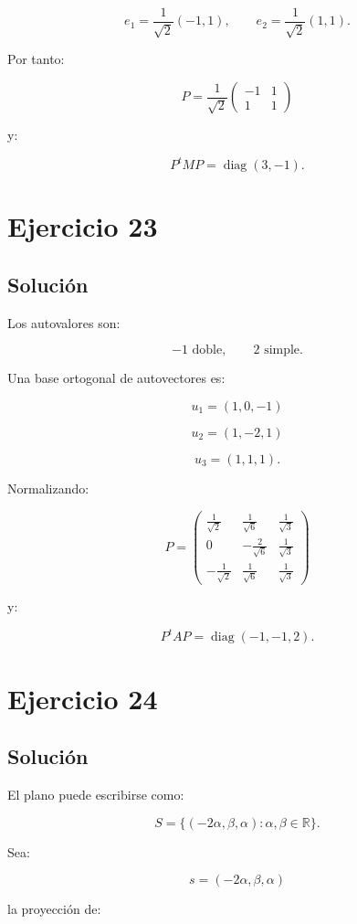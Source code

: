 \documentclass[11pt,a4paper]{article}
\newcommand{\R}{\mathbb{R}}
\newcommand{\diag}{\operatorname{diag}}
\begin{document}
\[
e_1=
\frac1{\sqrt2}(-1,1),
\qquad
e_2=
\frac1{\sqrt2}(1,1).
\]

Por tanto:

\[
\boxed{
P=
\frac1{\sqrt2}
\begin{pmatrix}
-1&1\\
1&1
\end{pmatrix}
}
\]

y:

\[
\boxed{
P^tMP=
\diag(3,-1).
}
\]

\section{Ejercicio 23}
\subsection{Solución}

Los autovalores son:

\[
-1\text{ doble},
\qquad
2\text{ simple}.
\]

Una base ortogonal de autovectores es:

\[
u_1=(1,0,-1)
\]

\[
u_2=(1,-2,1)
\]

\[
u_3=(1,1,1).
\]

Normalizando:

\[
\boxed{
P=
\begin{pmatrix}
\frac1{\sqrt2}&\frac1{\sqrt6}&\frac1{\sqrt3}\\
0&-\frac2{\sqrt6}&\frac1{\sqrt3}\\
-\frac1{\sqrt2}&\frac1{\sqrt6}&\frac1{\sqrt3}
\end{pmatrix}
}
\]

y:

\[
\boxed{
P^tAP
=
\diag(-1,-1,2).
}
\]

\section{Ejercicio 24}
\subsection{Solución}

El plano puede escribirse como:

\[
S=
\{(-2\alpha,\beta,\alpha):
\alpha,\beta\in\R\}.
\]

Sea:

\[
s=(-2\alpha,\beta,\alpha)
\]

la proyección de:
\end{document}
